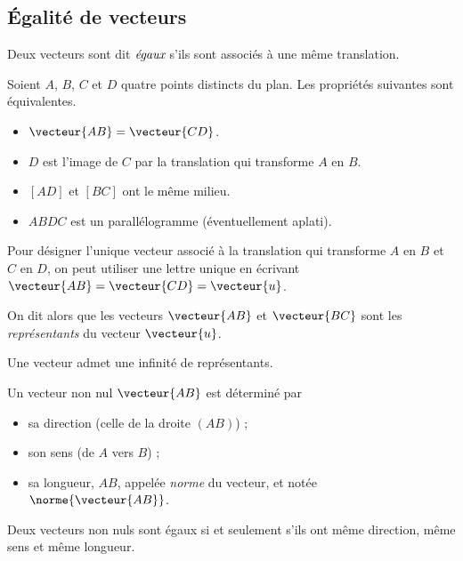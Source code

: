 \subsection{Égalité de vecteurs}

\begin{definition}
  Deux vecteurs sont dit $\emph{égaux}$ s'ils sont associés à une même translation.
\end{definition}

\begin{propriete}
  Soient $A$, $B$, $C$ et $D$ quatre points distincts du plan. Les propriétés suivantes sont équivalentes.
  \begin{itemize}[$\bullet$]
    \item $\vecteur{AB}=\vecteur{CD}$.
    \item $D$ est l'image de $C$ par la translation qui transforme $A$ en $B$.
    \item $[AD]$ et $[BC]$ ont le même milieu.
    \item $ABDC$ est un parallélogramme (éventuellement aplati).
  \end{itemize}
\end{propriete}

\begin{definition}
  Pour désigner l'unique vecteur associé à la translation qui transforme $A$ en $B$ et $C$ en $D$, on peut utiliser une lettre unique en écrivant $\vecteur{AB}=\vecteur{CD}=\vecteur{u}$.

  On dit alors que les vecteurs $\vecteur{AB}$ et $\vecteur{BC}$ sont les \emph{représentants} du vecteur $\vecteur{u}$.
\end{definition}

\begin{remarque}
  Une vecteur admet une infinité de représentants.
\end{remarque}

\begin{propriete}
  Un vecteur non nul $\vecteur{AB}$ est déterminé par 
  \begin{itemize}
    \item sa direction (celle de la droite $(AB)$) ;
    \item son sens (de $A$ vers $B$) ;
    \item sa longueur, $AB$, appelée \emph{norme} du vecteur, et notée $\norme{\vecteur{AB}}$.
  \end{itemize}
\end{propriete}

\begin{corollaire}
  Deux vecteurs non nuls sont égaux si et seulement s'ils ont même direction, même sens et même longueur.
\end{corollaire}

